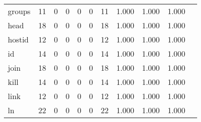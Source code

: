 \begin{longtable}{lp{1.10cm}p{1.10cm}p{1.10cm}p{1.10cm}p{1.10cm}p{1.10cm}p{1.10cm}p{1.10cm}p{1.10cm}p{1.10cm}}
groups    &                     11 &                                  0 &                                 0 &                                0 &                                 0 &                              11 &                          1.000 &                                 1.000 &                               1.000 \\
head      &                     18 &                                  0 &                                 0 &                                0 &                                 0 &                              18 &                          1.000 &                                 1.000 &                               1.000 \\
hostid    &                     12 &                                  0 &                                 0 &                                0 &                                 0 &                              12 &                          1.000 &                                 1.000 &                               1.000 \\
id        &                     14 &                                  0 &                                 0 &                                0 &                                 0 &                              14 &                          1.000 &                                 1.000 &                               1.000 \\
join      &                     18 &                                  0 &                                 0 &                                0 &                                 0 &                              18 &                          1.000 &                                 1.000 &                               1.000 \\
kill      &                     14 &                                  0 &                                 0 &                                0 &                                 0 &                              14 &                          1.000 &                                 1.000 &                               1.000 \\
link      &                     12 &                                  0 &                                 0 &                                0 &                                 0 &                              12 &                          1.000 &                                 1.000 &                               1.000 \\
ln        &                     22 &                                  0 &                                 0 &                                0 &                                 0 &                              22 &                          1.000 &                                 1.000 &                               1.000 \\

\end{longtable}
